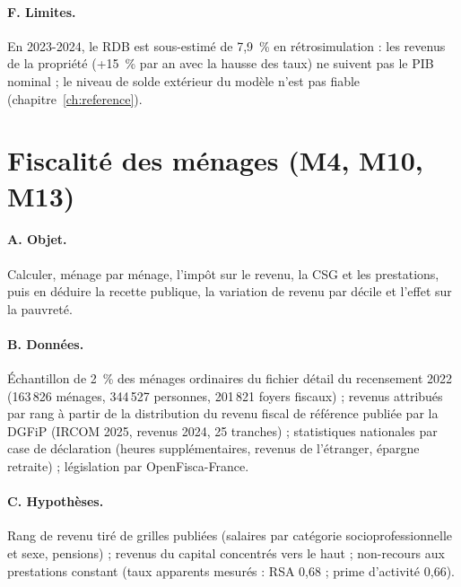 \paragraph{F. Limites.} En 2023-2024, le RDB est sous-estimé de 7,9~\% en rétrosimulation : les revenus de la propriété
(+15~\% par an avec la hausse des taux) ne suivent pas le PIB nominal ; le niveau de solde extérieur du modèle
n'est pas fiable (chapitre~\ref{ch:reference}).

\section{Fiscalité des ménages (M4, M10, M13)}
\label{sec:fiscmen}

\paragraph{A. Objet.} Calculer, ménage par ménage, l'impôt sur le revenu, la CSG et les prestations, puis en déduire
la recette publique, la variation de revenu par décile et l'effet sur la pauvreté.

\paragraph{B. Données.} Échantillon de 2~\% des ménages ordinaires du fichier détail du recensement 2022 (163\,826
ménages, 344\,527 personnes, 201\,821 foyers fiscaux) ; revenus attribués par rang à partir de la distribution du revenu
fiscal de référence publiée par la DGFiP (IRCOM 2025, revenus 2024, 25 tranches) ; statistiques nationales par case de
déclaration (heures supplémentaires, revenus de l'étranger, épargne retraite) ; législation par OpenFisca-France.

\paragraph{C. Hypothèses.} Rang de revenu tiré de grilles publiées (salaires par catégorie socioprofessionnelle et sexe,
pensions) ; revenus du capital concentrés vers le haut ; non-recours aux prestations constant (taux apparents mesurés :
RSA 0,68 ; prime d'activité 0,66).

